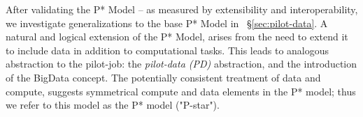 \documentclass[conference,final]{IEEEtran}
\newcommand{\jhanote}[1]{ {\textcolor{red} { ***shantenu: #1 }}}
\newcommand{\alnote}[1]{ {\textcolor{blue} { ***andrel: #1 }}}
\newcommand{\alnote}[1]{}
\newcommand{\jhanote}[1]{}
\begin{document}
After validating the P* Model -- as measured by extensibility and
interoperability,  we investigate generalizations to the base P*
Model in \ \S\ref{sec:pilot-data}.  A natural and logical extension of
the P* Model, arises from the need to extend it to include data in
addition to computational tasks.  This leads to analogous abstraction
to the pilot-job: the \emph{pilot-data (PD)} abstraction, and the
introduction of the BigData concept. The potentially consistent
treatment of data and compute, suggests symmetrical compute and data
elements in the P* model; thus we refer to this model as the P* model
("P-star").









\end{document}
